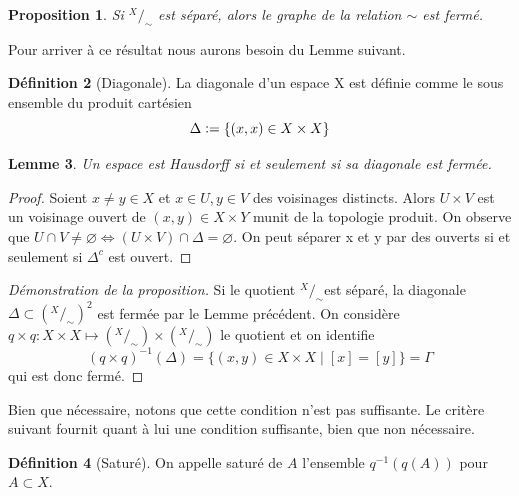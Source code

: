 \documentclass[12pt]{book}
\newcommand{\defeq}{\vcentcolon=}
\newtheorem{lemma}{Lemme}[section]
\newtheorem{prop}[lemma]{Proposition}
\theoremstyle{definition}
\newtheorem{definition}[lemma]{Définition}
\theoremstyle{remark}
\newcommand*\quot[2]{{^{\textstyle #1}\big/_{\textstyle #2}}}
\begin{document}
	\begin{prop}
		Si $\quot{X}{\sim}$ est séparé, alors le graphe de la relation  $\sim$ est fermé.
	\end{prop}
	Pour arriver à ce résultat nous aurons besoin du Lemme suivant.
	\begin{definition}[Diagonale]
		La diagonale d'un espace X est définie comme le sous ensemble du produit cartésien
	\[\Delta \defeq \{(x,x) \in X \times X\}\]
	\end{definition}
	\begin{lemma}
		Un espace est Hausdorff si et seulement si sa diagonale est fermée.
	\end{lemma}
	\begin{proof}
		Soient $x \neq y \in X$ et  $x \in U, y \in V$ des voisinages distincts. Alors  $U\times V$ est un voisinage ouvert de  $(x,y) \in X\times Y$ munit de la topologie produit. On observe que  $U\cap V \neq \varnothing \iff (U\times V) \cap \Delta = \varnothing$. On peut séparer x et y par des ouverts si et seulement si $\Delta^c$ est ouvert.
	\end{proof}
	\begin{proof}[Démonstration de la proposition]
		Si le quotient $\quot{X}{\sim}$est séparé, la diagonale $\Delta \subset (\quot{X}{\sim})^2$ est fermée par le Lemme précédent. On considère $q\times q : X \times X \longmapsto (\quot{X}{\sim}) \times (\quot{X}{\sim})$ le quotient et on identifie \[
		{(q \times q)}^{-1}(\Delta) = \{(x,y) \in X \times X \;|\; [x] = [y]\} = \Gamma 
		\] qui est donc fermé.	
	\end{proof}
	Bien que nécessaire, notons que cette condition n'est pas suffisante. Le critère suivant fournit quant à lui une condition suffisante, bien que non nécessaire. 
	\begin{definition}[Saturé]
		On appelle saturé de $A$ l'ensemble $q^{-1}(q(A))$ pour  $A \subset X$.
	\end{definition}
\end{document}
